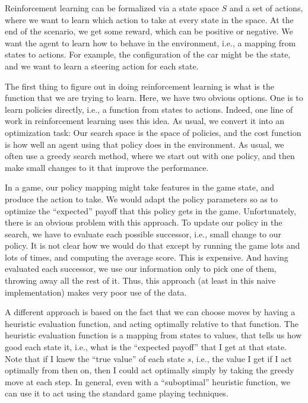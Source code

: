 Reinforcement learning can be formalized via a state space $S$ and a set of 
actions, where we want to learn which action to take at every state in the
space.  At the end of the scenario, we get some reward, which can be positive
or negative.  We want the agent to learn how to behave in the environment,
i.e., a mapping from states to actions.  For example, the configuration of
the car might be the state, and we want to learn a steering action for each
state.  

The first thing to figure out in doing reinforcement learning is what is the
function that we are trying to learn.  Here, we have two obvious options.
One is to learn policies directly, i.e., a function from states to actions.
Indeed, one line of work in reinforcement learning uses this idea.  As
usual, we convert it into an optimization task:  Our search space is the
space of policies, and the cost function is how well an agent using that
policy does in the environment.  As usual, we often use a greedy search
method, where we start out with one policy, and then make small changes to
it that improve the performance.  

In a game, our policy mapping might take features in the game state, 
and produce the action to take.  We would adapt the policy parameters
so as to optimize the ``expected'' payoff that this policy gets in the game.
Unfortunately, there is an obvious problem with this approach.  To update our
policy in the search, we have to evaluate each possible successor, i.e.,
small change to our policy.  It is not clear how we would do that except by
running the game lots and lots of times, and computing the average score.
This is expensive.  And having evaluated each successor, we use our
information only to pick one of them, throwing away all the rest of it.
Thus, this approach (at least in this naive implementation) makes very poor
use of the data.

A different approach is based on the fact that we can choose moves by having
a heuristic evaluation function, and acting optimally relative to that
function.  The heuristic evaluation function is a mapping from states to
values, that tells us how good each state it, i.e., what is the ``expected
payoff'' that I get at that state.  Note that if I knew the
``true value'' of each state $s$, i.e., the value I get if I act optimally
from then on, then I could act optimally simply by taking the greedy move at
each step.  In general, even with a ``suboptimal'' heuristic function, we
can use it to act using the standard game playing techniques.

